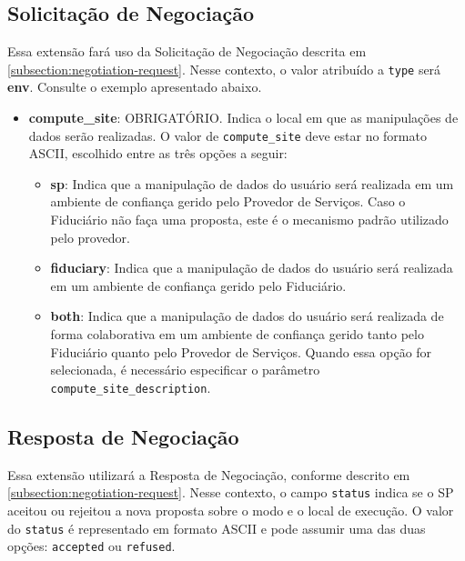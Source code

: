 

\subsection{Solicitação de Negociação}

Essa extensão fará uso da Solicitação de Negociação descrita em \autoref{subsection:negotiation-request}. Nesse contexto, o valor atribuído a \texttt{type} será \textbf{env}. Consulte o exemplo apresentado abaixo.



\begin{itemize}

    \item \textbf{compute\_site}: OBRIGATÓRIO. Indica o local em que as manipulações de dados serão realizadas. O valor de \texttt{compute\_site} deve estar no formato ASCII, escolhido entre as três opções a seguir:

    \begin{itemize}
    
        \item \textbf{sp}: Indica que a manipulação de dados do usuário será realizada em um ambiente de confiança gerido pelo Provedor de Serviços. Caso o Fiduciário não faça uma proposta, este é o mecanismo padrão utilizado pelo provedor.
        
        \item \textbf{fiduciary}: Indica que a manipulação de dados do usuário será realizada em um ambiente de confiança gerido pelo Fiduciário.
        
        \item \textbf{both}: Indica que a manipulação de dados do usuário será realizada de forma colaborativa em um ambiente de confiança gerido tanto pelo Fiduciário quanto pelo Provedor de Serviços. Quando essa opção for selecionada, é necessário especificar o parâmetro \texttt{compute\_site\_description}.
   
    \end{itemize}

\end{itemize}


\subsection{Resposta de Negociação}

Essa extensão utilizará a Resposta de Negociação, conforme descrito em \autoref{subsection:negotiation-request}. Nesse contexto, o campo \texttt{status} indica se o \acs{SP} aceitou ou rejeitou a nova proposta sobre o modo e o local de execução. O valor do \texttt{status} é representado em formato ASCII e pode assumir uma das duas opções: \texttt{accepted} ou \texttt{refused}.

